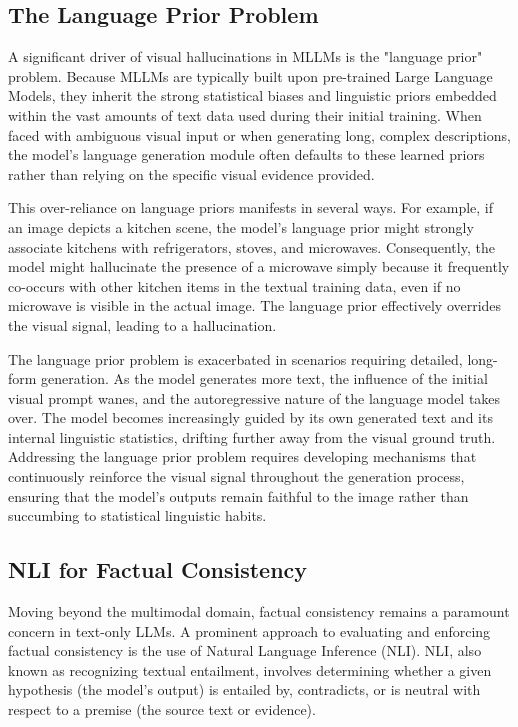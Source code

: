 \documentclass[11pt,a4paper]{article}
\begin{document}
\subsection{The Language Prior Problem}

A significant driver of visual hallucinations in MLLMs is the "language prior" problem. Because MLLMs are typically built upon pre-trained Large Language Models, they inherit the strong statistical biases and linguistic priors embedded within the vast amounts of text data used during their initial training. When faced with ambiguous visual input or when generating long, complex descriptions, the model's language generation module often defaults to these learned priors rather than relying on the specific visual evidence provided.

This over-reliance on language priors manifests in several ways. For example, if an image depicts a kitchen scene, the model's language prior might strongly associate kitchens with refrigerators, stoves, and microwaves. Consequently, the model might hallucinate the presence of a microwave simply because it frequently co-occurs with other kitchen items in the textual training data, even if no microwave is visible in the actual image. The language prior effectively overrides the visual signal, leading to a hallucination.

The language prior problem is exacerbated in scenarios requiring detailed, long-form generation. As the model generates more text, the influence of the initial visual prompt wanes, and the autoregressive nature of the language model takes over. The model becomes increasingly guided by its own generated text and its internal linguistic statistics, drifting further away from the visual ground truth. Addressing the language prior problem requires developing mechanisms that continuously reinforce the visual signal throughout the generation process, ensuring that the model's outputs remain faithful to the image rather than succumbing to statistical linguistic habits.

\subsection{NLI for Factual Consistency}

Moving beyond the multimodal domain, factual consistency remains a paramount concern in text-only LLMs. A prominent approach to evaluating and enforcing factual consistency is the use of Natural Language Inference (NLI). NLI, also known as recognizing textual entailment, involves determining whether a given hypothesis (the model's output) is entailed by, contradicts, or is neutral with respect to a premise (the source text or evidence).
\end{document}
